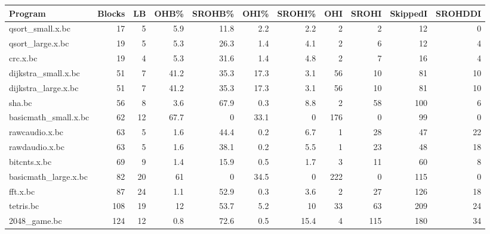 \begin{tabular}{|l|r|r|r|r|r|r|r|r|r|r|}
\hline
 Program              &   Blocks &   LB &   OHB\% &   SROHB\% &   OHI\% &   SROHI\% &   OHI &   SROHI &   SkippedI &   SROHDDI \\
\hline
 qsort\_small.x.bc     &       17 &    5 &    5.9 &     11.8 &    2.2 &      2.2 &     2 &       2 &         12 &         0 \\
\hline
 qsort\_large.x.bc     &       19 &    5 &    5.3 &     26.3 &    1.4 &      4.1 &     2 &       6 &         12 &         4 \\
\hline
 crc.x.bc             &       19 &    4 &    5.3 &     31.6 &    1.4 &      4.8 &     2 &       7 &         16 &         4 \\
\hline
 dijkstra\_small.x.bc  &       51 &    7 &   41.2 &     35.3 &   17.3 &      3.1 &    56 &      10 &         81 &        10 \\
\hline
 dijkstra\_large.x.bc  &       51 &    7 &   41.2 &     35.3 &   17.3 &      3.1 &    56 &      10 &         81 &        10 \\
\hline
 sha.bc               &       56 &    8 &    3.6 &     67.9 &    0.3 &      8.8 &     2 &      58 &        100 &         6 \\
\hline
 basicmath\_small.x.bc &       62 &   12 &   67.7 &      0   &   33.1 &      0   &   176 &       0 &         99 &         0 \\
\hline
 rawcaudio.x.bc       &       63 &    5 &    1.6 &     44.4 &    0.2 &      6.7 &     1 &      28 &         47 &        22 \\
\hline
 rawdaudio.x.bc       &       63 &    5 &    1.6 &     38.1 &    0.2 &      5.5 &     1 &      23 &         48 &        18 \\
\hline
 bitcnts.x.bc         &       69 &    9 &    1.4 &     15.9 &    0.5 &      1.7 &     3 &      11 &         60 &         8 \\
\hline
 basicmath\_large.x.bc &       82 &   20 &   61   &      0   &   34.5 &      0   &   222 &       0 &        115 &         0 \\
\hline
 fft.x.bc             &       87 &   24 &    1.1 &     52.9 &    0.3 &      3.6 &     2 &      27 &        126 &        18 \\
\hline
 tetris.bc            &      108 &   19 &   12   &     53.7 &    5.2 &     10   &    33 &      63 &        209 &        24 \\
\hline
 2048\_game.bc         &      124 &   12 &    0.8 &     72.6 &    0.5 &     15.4 &     4 &     115 &        180 &        34 \\

\end{tabular}
